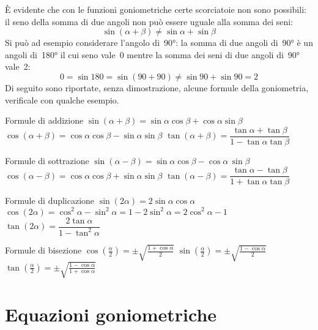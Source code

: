 È evidente che con le funzioni goniometriche certe scorciatoie non sono 
possibili: il seno della somma di due angoli non può essere uguale alla 
somma dei seni:
\vspace{-6pt}
\[\sin \left( \alpha + \beta \right) \ne \sin \alpha + \sin \beta\]
Si può ad esempio considerare l'angolo di~90°: la somma di due angoli di~90° 
è un angoli di~180° il cui seno vale~0 mentre la somma dei seni di  due angoli 
di~90° vale~2:
\vspace{-6pt}
\[0 = \sin 180 = \sin \left( 90 + 90 \right) \ne \sin 90 + \sin 90 = 2 \]
Di seguito sono riportate, senza dimostrazione, alcune formule della 
goniometria, verificale con qualche esempio.
\vspace{-6pt}

\begin{itemize*}
 \item Formule di addizione
  \subitem $\sin(\alpha + \beta)=\sin\alpha \cos\beta + \cos\alpha \sin\beta$
  \subitem $\cos(\alpha + \beta)=\cos\alpha \cos\beta - \sin\alpha \sin\beta$
  \subitem $\tan(\alpha + \beta)=\dfrac {\tan\alpha + \tan\beta} 
                                        {1 - \tan\alpha \tan\beta}$
 \item Formule di sottrazione
  \subitem $\sin(\alpha - \beta)=\sin\alpha \cos\beta - \cos\alpha \, \sin\beta$
  \subitem $\cos(\alpha - \beta)=\cos\alpha \cos\beta + \sin\alpha \sin\beta$
  \subitem $\tan(\alpha - \beta)=\dfrac {\tan\alpha - \tan\beta} 
                                        {1 + \tan\alpha \tan\beta}$
 \item Formule di duplicazione
  \subitem $\sin(2\alpha)=2\sin\alpha \cos\alpha$
  \subitem $\cos(2\alpha)=\cos^2\alpha - \sin^2\alpha = 1 - 2\sin^{2}\alpha = 
            2\cos^{2}\alpha - 1$
  \subitem $\tan(2\alpha)=\dfrac{2\tan\alpha}{1 - \tan^2\alpha}$
 \item Formule di bisezione
  \subitem $\cos\left(\frac{\alpha} 2\right)=\pm\sqrt{\frac{1+\cos\alpha}{2} }$
  \subitem $\sin\left(\frac{\alpha} 2\right)=\pm\sqrt{\frac{1-\cos\alpha}{2} }$
  \subitem $\tan\left(\frac{\alpha} 2\right)=\pm\sqrt{\frac{1-\cos\alpha}
                                                           {1+\cos\alpha}}$
\end{itemize*}

\section{Equazioni goniometriche}
\label{sec:gonio_equazionigonio}

